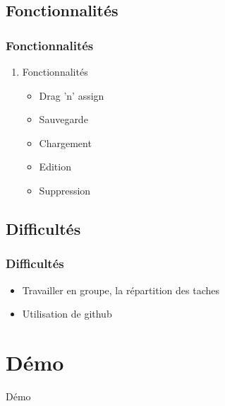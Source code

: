 \documentclass[12pt]{beamer}
\begin{document}
\subsection{Fonctionnalités}
    \begin{frame} 
    \frametitle{Fonctionnalités}
        \begin{enumerate}
            \item Fonctionnalités
            \begin{itemize}
                \item Drag 'n' assign
                \item Sauvegarde
                \item Chargement
                \item Edition
                \item Suppression
            \end{itemize}    
        \end{enumerate}
\end{frame}

\subsection{Difficultés}
    \begin{frame}
    \frametitle{Difficultés}
        \begin{itemize}
          \item Travailler en groupe, la répartition des taches
          \item Utilisation de github
        \end{itemize}
    \end{frame}

\section{Démo}
    \begin{frame}{Démo}
    \end{frame}
\end{document}
